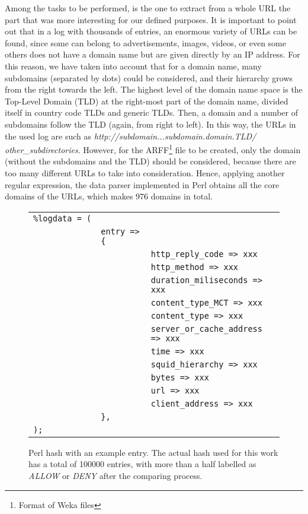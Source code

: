 \documentclass{llncs}
\begin{document}
Among the tasks to be performed, is the one to extract from a whole URL the part that was more interesting for our defined purposes. It is important to point out that in a log with thousands of entries, an enormous variety of URLs can be found, since some can belong to advertisements, images, videos, or even some others does not have a domain name but are given directly by an IP address. For this reason, we have taken into account that for a domain name, many subdomains (separated by dots) could be considered, and their hierarchy grows from the right towards the left. The highest level of the domain name space is the Top-Level Domain (TLD) at the right-most part of the domain name, divided itself in country code TLDs and generic TLDs. Then, a domain and a number of subdomains follow the TLD (again, from right to left). In this way, the URLs in the
used log are such as \textit{http://subdomain...subdomain.domain.TLD/} \textit{other\_subdirectories}. However, for the ARFF\footnote{Format of Weka files} file to be created, only the domain (without the subdomains and the TLD) should be considered, because there are too many different URLs to take into consideration. Hence, applying another regular expression, the data parser implemented in Perl obtains all the core domains of the URLs, which makes 976 domains in total.

\begin{figure}[htb]
\centering
\begin{tabular}{ p{0.1cm} p{0.1cm} p{6cm} }
  \texttt{\%logdata~=~(} & & \\
   & \texttt{entry~=>\{} & \\
   & & \texttt{http\_reply\_code => xxx} \\
   & & \texttt{http\_method => xxx} \\
   & & \texttt{duration\_miliseconds => xxx} \\
   & & \texttt{content\_type\_MCT => xxx} \\
   & & \texttt{content\_type => xxx} \\
   & & \texttt{server\_or\_cache\_address => xxx} \\
   & & \texttt{time => xxx} \\
   & & \texttt{squid\_hierarchy => xxx} \\
   & & \texttt{bytes => xxx} \\
   & & \texttt{url => xxx} \\
   & & \texttt{client\_address => xxx} \\
   & \texttt{\},} & \\
  \texttt{);} & & \\
\end{tabular}
\caption{Perl hash with an example entry. The actual hash used for this work has a total of 100000 entries, with more than a half labelled as \textit{ALLOW} or \textit{DENY} after the comparing process. \label{fig:data_hash}}
\end{figure}
\end{document}

